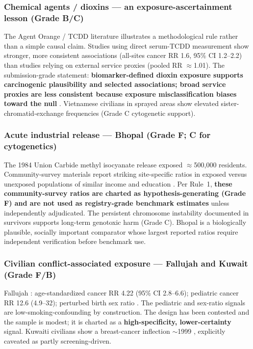 \documentclass[3p,times]{elsarticle}
\begin{document}
\subsubsection{Chemical agents / dioxins --- an exposure-ascertainment lesson (Grade B/C)}\label{sec:dioxin}
The Agent Orange / TCDD literature illustrates a methodological rule rather than a simple causal claim. Studies using direct serum-TCDD measurement \citep{akhtar2004,steenland1999} show stronger, more consistent associations (all-sites cancer RR 1.6, 95\% CI 1.2--2.2) than studies relying on external service proxies (pooled RR $\approx$1.01). The submission-grade statement: \textbf{biomarker-defined dioxin exposure supports carcinogenic plausibility and selected associations; broad service proxies are less consistent because exposure misclassification biases toward the null} \citep{iomvao,pesatori2009}. Vietnamese civilians in sprayed areas show elevated sister-chromatid-exchange frequencies (Grade C cytogenetic support).

\subsubsection{Acute industrial release --- Bhopal (Grade F; C for cytogenetics)}
The 1984 Union Carbide methyl isocyanate release exposed $\approx$500,000 residents. Community-survey materials report striking site-specific ratios in exposed versus unexposed populations of similar income and education \citep{sambhavna,dhara2002}. Per Rule~1, \textbf{these community-survey ratios are charted as hypothesis-generating (Grade F) and are not used as registry-grade benchmark estimates} unless independently adjudicated. The persistent chromosome instability documented in survivors \citep{mishra2009,senthilkumar2012} supports long-term genotoxic harm (Grade C). Bhopal is a biologically plausible, socially important comparator whose largest reported ratios require independent verification before benchmark use.

\subsubsection{Civilian conflict-associated exposure --- Fallujah and Kuwait (Grade F/B)}
Fallujah \citep{busby2010}: age-standardized cancer RR 4.22 (95\% CI 2.8--6.6); pediatric cancer RR 12.6 (4.9--32); perturbed birth sex ratio \citep{alaani2011}. The pediatric and sex-ratio signals are low-smoking-confounding by construction. The design has been contested and the sample is modest; it is charted as a \textbf{high-specificity, lower-certainty} signal. Kuwaiti civilians show a breast-cancer inflection $\sim$1999 \citep{cange2013,alawadhi2023}, explicitly caveated as partly screening-driven.
\end{document}
